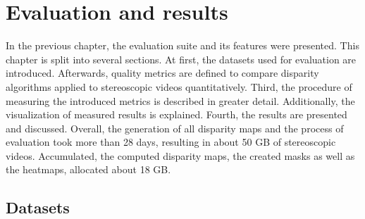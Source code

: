 \chapter{Evaluation and results}
\label{chap:eval}

In the previous chapter, the evaluation suite and its features were presented.
This chapter is split into several sections.
At first, the datasets used for evaluation are introduced.
Afterwards, quality metrics are defined to compare disparity algorithms applied to stereoscopic videos quantitatively.
Third, the procedure of measuring the introduced metrics is described in greater detail.
Additionally, the visualization of measured results is explained.
Fourth, the results are presented and discussed.
\newline\newline\noindent Overall, the generation of all disparity maps and the process of evaluation took more than 28 days, resulting in about 50 GB of stereoscopic videos.
Accumulated, the computed disparity maps, the created masks as well as the heatmaps, allocated about 18 GB.

\section{Datasets}

